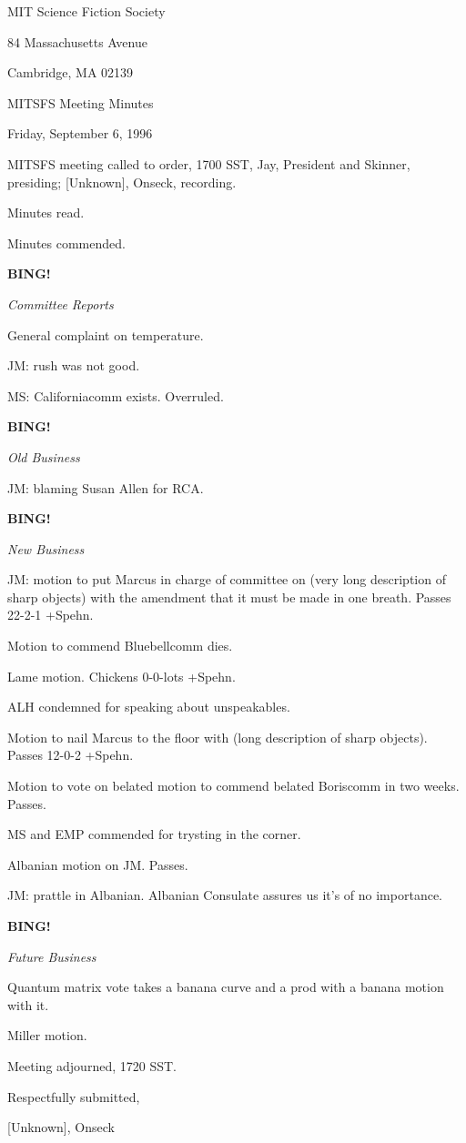 \documentclass[12pt]{article}
\newcommand{\bing}{{\bf BING!} }
\newcommand{\goto}[1]{\bing \vskip 12pt \centerline{{\em{#1}}}}
\begin{document}
\begin{center}

MIT Science Fiction Society 

84 Massachusetts Avenue

Cambridge, MA 02139

\vspace{12pt}

MITSFS Meeting Minutes 

Friday, September 6, 1996

\end{center}
 
\vspace{18pt}

\setlength{\parskip}{6pt}

\noindent
MITSFS meeting called to order, 1700 SST,
Jay, President and Skinner, presiding; [Unknown], Onseck, recording.

Minutes read.

Minutes commended.

\goto{Committee Reports}

General complaint on temperature.

JM: rush was not good.

MS: Californiacomm exists. Overruled.

\goto{Old Business}

JM: blaming Susan Allen for RCA.

\goto{New Business}

JM: motion to put Marcus in charge of committee on (very long description of sharp objects) with the amendment that it must be made in one breath. Passes 22-2-1 +Spehn.

Motion to commend Bluebellcomm dies.

Lame motion. Chickens 0-0-lots +Spehn.

ALH condemned for speaking about unspeakables.

Motion to nail Marcus to the floor with (long description of sharp objects). Passes 12-0-2 +Spehn.

Motion to vote on belated motion to commend belated Boriscomm in two weeks. Passes.

MS and EMP commended for trysting in the corner.

Albanian motion on JM. Passes.

JM: prattle in Albanian. Albanian Consulate assures us it's of no importance.

\goto{Future Business}

Quantum matrix vote takes a banana curve and a prod with a banana motion with it.

Miller motion.

\vspace{12pt}

\noindent
Meeting adjourned, 1720 SST.

\vspace{18pt}

\centerline{Respectfully submitted,}
\centerline{[Unknown], Onseck}
\end{document}
